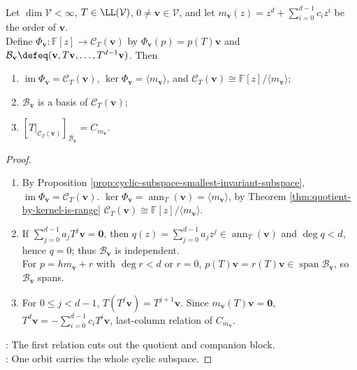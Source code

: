 \begin{theorem} \label{thm:cyclic-subspace-quotient-and-companion} \label{prop:cyclic-basis-gives-companion-matrix} \\
Let $\dim\mathcal{V}<\infty$, $T\in\LL(\mathcal{V})$, $0\neq\mathbf{v}\in\mathcal{V}$, and let $m_{\mathbf{v}}(z)=z^d+\sum\limits_{i=0}^{d-1}c_iz^i$ be the order of $\mathbf{v}$.\\
Define $\Phi_{\mathbf{v}}:\mathbb{F}[z]\to\mathcal{C}_T(\mathbf{v})$ by $\Phi_{\mathbf{v}}(p)=p(T)\mathbf{v}$ and $\mathcal{B}_{\mathbf{v}}\defeq(\mathbf{v},T\mathbf{v},\ldots,T^{d-1}\mathbf{v})$. Then
\begin{enumerate}[label=(\roman*)]
\setlength{\itemsep}{0pt}
\item $\operatorname{im}\Phi_{\mathbf{v}}=\mathcal{C}_T(\mathbf{v})$, $\ker\Phi_{\mathbf{v}}=\langle m_{\mathbf{v}}\rangle$, and $\mathcal{C}_T(\mathbf{v})\cong\mathbb{F}[z]/\langle m_{\mathbf{v}}\rangle$;
\item $\mathcal{B}_{\mathbf{v}}$ is a basis of $\mathcal{C}_T(\mathbf{v})$;
\item $[T|_{\mathcal{C}_T(\mathbf{v})}]_{\mathcal{B}_{\mathbf{v}}}=C_{m_{\mathbf{v}}}$.
\end{enumerate}
\begin{proof}
\begin{enumerate}[label=(\roman*)]
\setlength{\itemsep}{0pt}
\item By Proposition \ref{prop:cyclic-subspace-smallest-invariant-subspace}, $\operatorname{im}\Phi_{\mathbf{v}}=\mathcal{C}_T(\mathbf{v})$. $\ker\Phi_{\mathbf{v}}=\operatorname{ann}_T(\mathbf{v})=\langle m_{\mathbf{v}}\rangle$, by Theorem \ref{thm:quotient-by-kernel-is-range} $\mathcal{C}_T(\mathbf{v})\cong\mathbb{F}[z]/\langle m_{\mathbf{v}}\rangle$.
\item If $\sum\limits_{j=0}^{d-1}a_jT^j\mathbf{v}=\mathbf{0}$, then $q(z)=\sum\limits_{j=0}^{d-1}a_jz^j\in\operatorname{ann}_T(\mathbf{v})$ and $\deg q<d$, hence $q=0$; thus $\mathcal{B}_{\mathbf{v}}$ is independent.\\
For $p=hm_{\mathbf{v}}+r$ with $\deg r<d$ or $r=0$, $p(T)\mathbf{v}=r(T)\mathbf{v}\in\operatorname{span}\mathcal{B}_{\mathbf{v}}$, so $\mathcal{B}_{\mathbf{v}}$ spans.
\item For $0\leq j<d-1$, $T(T^j\mathbf{v})=T^{j+1}\mathbf{v}$. Since $m_{\mathbf{v}}(T)\mathbf{v}=\mathbf{0}$, $T^d\mathbf{v}=-\sum\limits_{i=0}^{d-1}c_iT^i\mathbf{v}$, last-column relation of $C_{m_{\mathbf{v}}}$.
\end{enumerate}
: The first relation cuts out the quotient and companion block.\\
: One orbit carries the whole cyclic subspace.
\end{proof}
\end{theorem}

